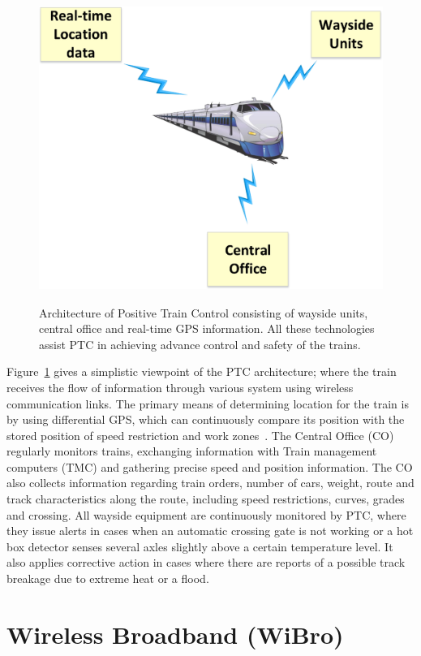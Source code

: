\begin{figure}[!ht]
\centering
\includegraphics[width=\textwidth,height=10cm,keepaspectratio]{images/Gill/5G/ptc.eps} 
\caption{Architecture of Positive Train Control consisting of wayside units, central office and real-time GPS information. All these technologies assist PTC in achieving advance control and safety of the trains.}
\label{ptc}
\end{figure}


Figure~\ref{ptc} gives a simplistic viewpoint of the PTC architecture; where the train receives the flow of information through various system using wireless communication links. The primary means of determining location for the train is by using differential GPS, which can continuously compare its position with the stored position of speed restriction and work zones~\cite{5338992}. The Central Office (CO) regularly monitors trains, exchanging information with Train management computers (TMC) and gathering precise speed and position information. The CO also collects information regarding train orders, number of cars, weight, route and track characteristics along the route, including speed restrictions, curves, grades and crossing. All wayside equipment are continuously monitored by PTC, where they issue alerts in cases when an automatic crossing gate is not working or a hot box detector senses several axles slightly above a certain temperature level. It also applies corrective action in cases where there are reports of a possible track breakage due to extreme heat or a flood.

\section{Wireless Broadband (WiBro)}

